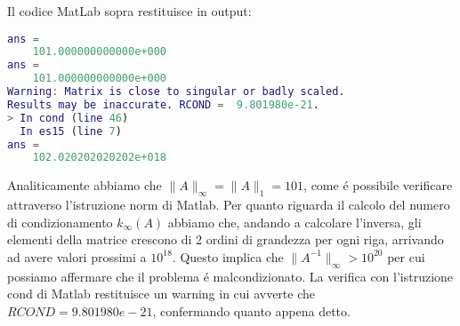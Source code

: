 \begin{flushleft}

Il codice MatLab sopra restituisce in output:
\begin{lstlisting}[language=matlab, basicstyle = \small]
ans =
    101.000000000000e+000
ans =
    101.000000000000e+000
Warning: Matrix is close to singular or badly scaled.
Results may be inaccurate. RCOND =  9.801980e-21. 
> In cond (line 46)
  In es15 (line 7) 
ans =
    102.020202020202e+018
\end{lstlisting}
Analiticamente abbiamo che $\rVert A \rVert_{\infty} = \rVert A \rVert_1 = 101$, come \'e possibile verificare attraverso l'istruzione norm di Matlab.
Per quanto riguarda il calcolo del numero di condizionamento $k_{\infty}(A)$ abbiamo che, andando a calcolare l'inversa, gli elementi della matrice crescono di 2 ordini di grandezza per ogni riga, arrivando ad avere valori prossimi a $10^{18}$. Questo implica che $\rVert A^{-1} \rVert_{\infty}>10^{20}$ per cui possiamo affermare che il problema \'e malcondizionato.
La verifica con l'istruzione cond di Matlab restituisce un warning in cui avverte che $RCOND=9.801980e-21$, confermando quanto appena detto.
\end{flushleft}